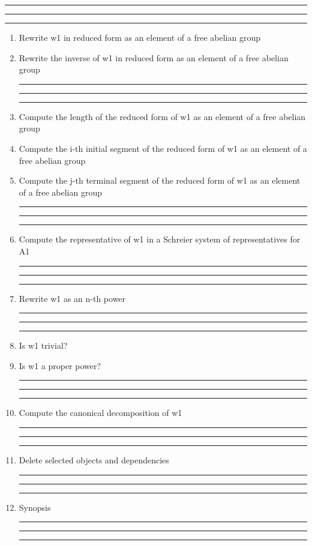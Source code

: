 
\bigskip
\hrule\hrule\hrule

\begin{enumerate}

\item Rewrite w1 in reduced form as an element of a free abelian
group

\item Rewrite the inverse of w1 in reduced form as an element of a free abelian
group

\bigskip
\hrule\hrule\hrule

\item Compute the length of the reduced form of w1 as an element of a free abelian
group

\item Compute the i-th initial segment of the reduced form of w1 as an
element of a free abelian group

\item Compute the j-th terminal segment of the reduced form of w1 as an element
of a free abelian group

\bigskip
\hrule\hrule\hrule

\item Compute the representative of w1 in a Schreier system of representatives for
A1


\bigskip
\hrule\hrule\hrule

\item Rewrite w1 as an n-th power

\bigskip
\hrule\hrule\hrule

\item Is w1 trivial?

\item Is w1 a proper power?

\bigskip
\hrule\hrule\hrule

\item Compute the canonical decomposition of w1

\bigskip
\hrule\hrule\hrule

\item Delete selected objects and dependencies

\bigskip
\hrule\hrule\hrule

\item
Synopsis

\bigskip
\hrule\hrule\hrule

\end{enumerate}
